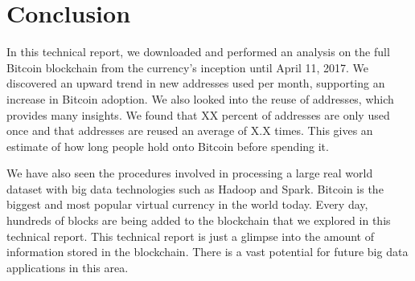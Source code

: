 \documentclass[9pt,twocolumn,twoside]{idsi}
\begin{document}
\section{Conclusion}
In this technical report, we downloaded and performed an analysis on the full Bitcoin blockchain from the currency's inception until April 11, 2017. We discovered an upward trend in new addresses used per month, supporting an increase in Bitcoin adoption. We also looked into the reuse of addresses, which provides many insights. We found that XX percent of addresses are only used once and that addresses are reused an average of X.X times. This gives an estimate of how long people hold onto Bitcoin before spending it.

We have also seen the procedures involved in processing a large real world dataset with big data technologies such as Hadoop and Spark. Bitcoin is the biggest and most popular virtual currency in the world today. Every day, hundreds of blocks are being added to the blockchain that we explored in this technical report. This technical report is just a glimpse into the amount of information stored in the blockchain. There is a vast potential for future big data applications in this area.
\end{document}
